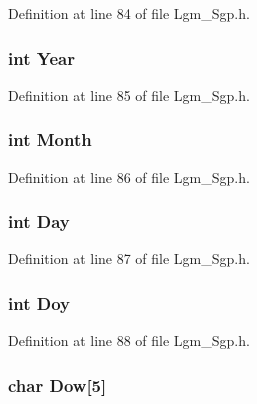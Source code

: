 Definition at line 84 of file Lgm\_\-Sgp.h.\hypertarget{struct___sgp_t_l_e_42e645110404fbf4f10235789577fa32}{
\subsubsection[{Year}]{\setlength{\rightskip}{0pt plus 5cm}int {\bf Year}}}
\label{struct___sgp_t_l_e_42e645110404fbf4f10235789577fa32}




Definition at line 85 of file Lgm\_\-Sgp.h.\hypertarget{struct___sgp_t_l_e_530b376ec91a278ac98531d3ea17f148}{
\subsubsection[{Month}]{\setlength{\rightskip}{0pt plus 5cm}int {\bf Month}}}
\label{struct___sgp_t_l_e_530b376ec91a278ac98531d3ea17f148}




Definition at line 86 of file Lgm\_\-Sgp.h.\hypertarget{struct___sgp_t_l_e_8f67164de537e3ec2b47e3204ddd3400}{
\subsubsection[{Day}]{\setlength{\rightskip}{0pt plus 5cm}int {\bf Day}}}
\label{struct___sgp_t_l_e_8f67164de537e3ec2b47e3204ddd3400}




Definition at line 87 of file Lgm\_\-Sgp.h.\hypertarget{struct___sgp_t_l_e_72a1d4d4121176f8cf34faa09b5b4982}{
\subsubsection[{Doy}]{\setlength{\rightskip}{0pt plus 5cm}int {\bf Doy}}}
\label{struct___sgp_t_l_e_72a1d4d4121176f8cf34faa09b5b4982}




Definition at line 88 of file Lgm\_\-Sgp.h.\hypertarget{struct___sgp_t_l_e_2837532bf73f7b76480715042d548d63}{
\subsubsection[{Dow}]{\setlength{\rightskip}{0pt plus 5cm}char {\bf Dow}\mbox{[}5\mbox{]}}}
\label{struct___sgp_t_l_e_2837532bf73f7b76480715042d548d63}




